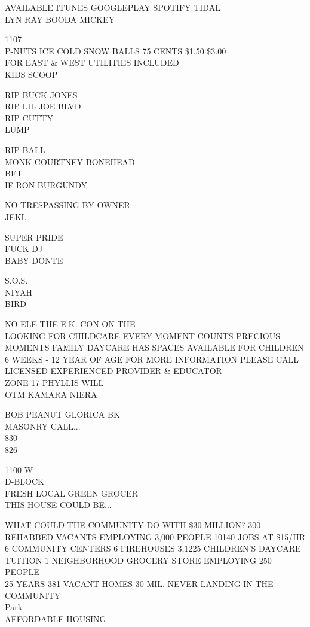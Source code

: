 \documentclass[10pt,letterpaper]{article}
\begin{document}
AVAILABLE ITUNES GOOGLEPLAY SPOTIFY TIDAL\\
LYN RAY BOODA MICKEY

1107\\
P{-}NUTS ICE COLD SNOW BALLS 75 CENTS \$1.50 \$3.00\\
FOR EAST \& WEST UTILITIES INCLUDED\\
KIDS SCOOP

RIP BUCK JONES\\
RIP LIL JOE BLVD\\
RIP CUTTY\\
LUMP

RIP BALL\\
MONK COURTNEY BONEHEAD\\
BET\\
IF RON BURGUNDY

NO TRESPASSING BY OWNER\\
JEKL

SUPER PRIDE\\
FUCK DJ\\
BABY DONTE

S.O.S.\\
NIYAH\\
BIRD

NO ELE THE E.K. CON ON THE\\
LOOKING FOR CHILDCARE EVERY MOMENT COUNTS PRECIOUS MOMENTS FAMILY DAYCARE HAS SPACES AVAILABLE FOR CHILDREN 6 WEEKS {-} 12 YEAR OF AGE FOR MORE INFORMATION PLEASE CALL LICENSED EXPERIENCED PROVIDER \& EDUCATOR\\
ZONE 17 PHYLLIS WILL\\
OTM KAMARA NIERA

BOB PEANUT GLORICA BK\\
MASONRY CALL...\\
830\\
826

1100 W\\
D{-}BLOCK\\
FRESH LOCAL GREEN GROCER\\
THIS HOUSE COULD BE...

WHAT COULD THE COMMUNITY DO WITH \$30 MILLION?  300 REHABBED VACANTS EMPLOYING 3,000 PEOPLE 10140 JOBS AT \$15/HR 6 COMMUNITY CENTERS 6 FIREHOUSES 3,1225 CHILDREN'S DAYCARE TUITION 1 NEIGHBORHOOD GROCERY STORE EMPLOYING 250 PEOPLE\\
25 YEARS 381 VACANT HOMES 30 MIL. NEVER LANDING IN THE COMMUNITY\\
Park\\
AFFORDABLE HOUSING
\end{document}
